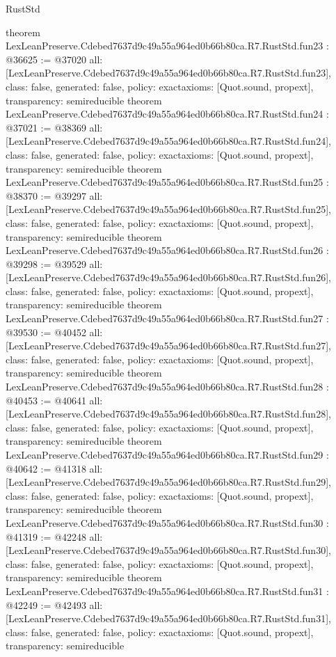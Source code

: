 \begin{lexlean}{RustStd}
\begin{coremodule}
{}
theorem LexLeanPreserve.Cdebed7637d9c49a55a964ed0b66b80ca.R7.RustStd.fun23 : @36625 := @37020 {
  all: [LexLeanPreserve.Cdebed7637d9c49a55a964ed0b66b80ca.R7.RustStd.fun23],
  class: false,
  generated: false,
  policy: exact{axioms: [Quot.sound, propext]},
  transparency: semireducible
}
theorem LexLeanPreserve.Cdebed7637d9c49a55a964ed0b66b80ca.R7.RustStd.fun24 : @37021 := @38369 {
  all: [LexLeanPreserve.Cdebed7637d9c49a55a964ed0b66b80ca.R7.RustStd.fun24],
  class: false,
  generated: false,
  policy: exact{axioms: [Quot.sound, propext]},
  transparency: semireducible
}
theorem LexLeanPreserve.Cdebed7637d9c49a55a964ed0b66b80ca.R7.RustStd.fun25 : @38370 := @39297 {
  all: [LexLeanPreserve.Cdebed7637d9c49a55a964ed0b66b80ca.R7.RustStd.fun25],
  class: false,
  generated: false,
  policy: exact{axioms: [Quot.sound, propext]},
  transparency: semireducible
}
theorem LexLeanPreserve.Cdebed7637d9c49a55a964ed0b66b80ca.R7.RustStd.fun26 : @39298 := @39529 {
  all: [LexLeanPreserve.Cdebed7637d9c49a55a964ed0b66b80ca.R7.RustStd.fun26],
  class: false,
  generated: false,
  policy: exact{axioms: [Quot.sound, propext]},
  transparency: semireducible
}
theorem LexLeanPreserve.Cdebed7637d9c49a55a964ed0b66b80ca.R7.RustStd.fun27 : @39530 := @40452 {
  all: [LexLeanPreserve.Cdebed7637d9c49a55a964ed0b66b80ca.R7.RustStd.fun27],
  class: false,
  generated: false,
  policy: exact{axioms: [Quot.sound, propext]},
  transparency: semireducible
}
theorem LexLeanPreserve.Cdebed7637d9c49a55a964ed0b66b80ca.R7.RustStd.fun28 : @40453 := @40641 {
  all: [LexLeanPreserve.Cdebed7637d9c49a55a964ed0b66b80ca.R7.RustStd.fun28],
  class: false,
  generated: false,
  policy: exact{axioms: [Quot.sound, propext]},
  transparency: semireducible
}
theorem LexLeanPreserve.Cdebed7637d9c49a55a964ed0b66b80ca.R7.RustStd.fun29 : @40642 := @41318 {
  all: [LexLeanPreserve.Cdebed7637d9c49a55a964ed0b66b80ca.R7.RustStd.fun29],
  class: false,
  generated: false,
  policy: exact{axioms: [Quot.sound, propext]},
  transparency: semireducible
}
theorem LexLeanPreserve.Cdebed7637d9c49a55a964ed0b66b80ca.R7.RustStd.fun30 : @41319 := @42248 {
  all: [LexLeanPreserve.Cdebed7637d9c49a55a964ed0b66b80ca.R7.RustStd.fun30],
  class: false,
  generated: false,
  policy: exact{axioms: [Quot.sound, propext]},
  transparency: semireducible
}
theorem LexLeanPreserve.Cdebed7637d9c49a55a964ed0b66b80ca.R7.RustStd.fun31 : @42249 := @42493 {
  all: [LexLeanPreserve.Cdebed7637d9c49a55a964ed0b66b80ca.R7.RustStd.fun31],
  class: false,
  generated: false,
  policy: exact{axioms: [Quot.sound, propext]},
  transparency: semireducible
}
\end{coremodule}
\end{lexlean}
